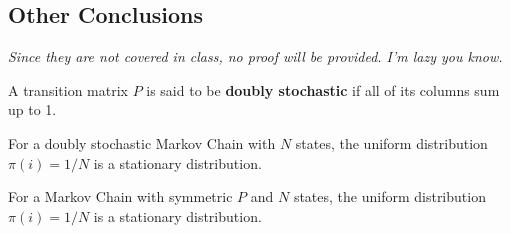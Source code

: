 \subsection{Other Conclusions}
\emph{Since they are not covered in class, no proof will be provided. I'm lazy you know.}
\begin{definition}
    A transition matrix $P$ is said to be \textbf{doubly stochastic} if all of its columns sum up to 1.
\end{definition}
\begin{optTheorem}
    For a doubly stochastic Markov Chain with $N$ states, the uniform distribution $\pi(i) = 1/N$ is a stationary distribution.
\end{optTheorem}
\begin{optTheorem}
    For a Markov Chain with symmetric $P$ and $N$ states, the uniform distribution $\pi(i) = 1/N$ is a stationary distribution.
\end{optTheorem}